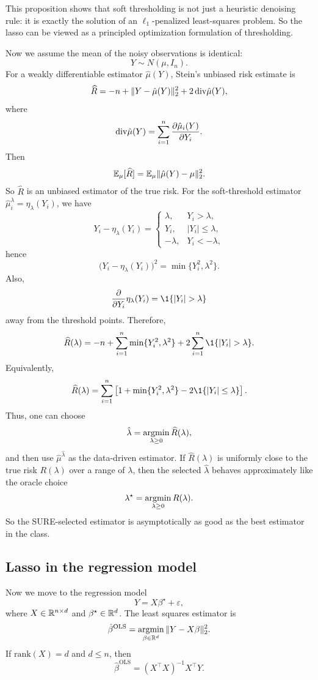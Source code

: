 \begin{remark}
This proposition shows that soft thresholding is not just a heuristic denoising rule:
it is exactly the solution of an $\ell_1$-penalized least-squares problem.
So the lasso can be viewed as a principled optimization formulation of thresholding.
\end{remark}


Now we assume the mean of the noisy observations is identical:
\[
Y \sim N(\mu, I_n).
\]
For a weakly differentiable estimator $\hat\mu(Y)$, Stein's unbiased risk estimate is
\[
\widehat R
=
-n + \|Y-\hat\mu(Y)\|_2^2 + 2\,\mathrm{div} \hat\mu(Y),
\]
where
\[
\mathrm{div} \hat\mu(Y)=\sum_{i=1}^n \frac{\partial \hat\mu_i(Y)}{\partial Y_i}.
\]
Then
\[
\mathbb{E}_\mu[\widehat R]=\mathbb{E}_\mu\|\hat\mu(Y)-\mu\|_2^2.
\]
So $\widehat R$ is an unbiased estimator of the true risk. 
For the soft-threshold estimator $\hat\mu^\lambda_i=\eta_\lambda(Y_i)$, we have
\[
Y_i-\eta_\lambda(Y_i)
=
\begin{cases}
\lambda, & Y_i>\lambda,\\
Y_i, & |Y_i|\le \lambda,\\
-\lambda, & Y_i<-\lambda,
\end{cases}
\]
hence
\[
\bigl(Y_i-\eta_\lambda(Y_i)\bigr)^2=\min\{Y_i^2,\lambda^2\}.
\]
Also,
\[
\frac{\partial}{\partial Y_i}\eta_\lambda(Y_i)=\1\{|Y_i|>\lambda\}
\]
away from the threshold points. Therefore,
\[
\widehat R(\lambda)
=
-n+\sum_{i=1}^n \min\{Y_i^2,\lambda^2\}
+2\sum_{i=1}^n \1\{|Y_i|>\lambda\}.
\]
Equivalently,
\[
\widehat R(\lambda)
=
\sum_{i=1}^n
\left[
1+\min\{Y_i^2,\lambda^2\}
-2\1\{|Y_i|\le \lambda\}
\right].
\]
Thus, one can choose
\[
\hat\lambda
=
\argmin_{\lambda\ge 0}\widehat R(\lambda),
\]
and then use $\hat\mu^{\hat\lambda}$ as the data-driven estimator. If $\widehat R(\lambda)$ is uniformly close to the true risk $R(\lambda)$ over a range of $\lambda$, then the selected $\hat\lambda$ behaves approximately like the oracle choice
\[
\lambda^\star=\argmin_{\lambda\ge 0} R(\lambda).
\]
So the SURE-selected estimator is asymptotically as good as the best estimator in the class.

\subsection{Lasso in the regression model}
Now we move to the regression model
\[
Y = X\beta^\star + \varepsilon,
\]
where $X\in\mathbb{R}^{n\times d}$ and $\beta^\star\in\mathbb{R}^d$. The least squares estimator is
\[
\hat\beta^{\mathrm{OLS}}
=
\argmin_{\beta\in\R^d}\|Y-X\beta\|_2^2.
\]
If $\mathrm{rank}(X)=d$ and $d\le n$, then
\[
\hat\beta^{\mathrm{OLS}}=(X^\top X)^{-1}X^\top Y.
\]

